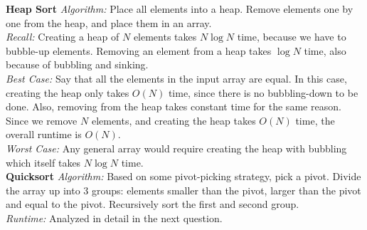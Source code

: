 \begin{solution}
\textbf{Heap Sort}
\textit{Algorithm:} Place all elements into a heap. Remove elements one by one from the heap, and place them in an array.\\
\textit{Recall:} Creating a heap of $N$ elements takes $N \log N$ time, because we have to bubble-up elements. Removing an element from a heap takes $\log N$ time, also because of bubbling and sinking. \\
\textit{Best Case:} Say that all the elements in the input array are equal. In this case, creating the heap only takes $O(N)$ time, since there is no bubbling-down to be done. Also, removing from the heap takes constant time for the same reason. Since we remove $N$ elements, and creating the heap takes $O(N)$ time, the overall runtime is $O(N)$.\\
\textit{Worst Case:} Any general array would require creating the heap with bubbling which itself takes $N \log N$ time.\\ 

\textbf{Quicksort}
\textit{Algorithm:} Based on some pivot-picking strategy, pick a pivot. Divide the array up into 3 groups: elements smaller than the pivot, larger than the pivot and equal to the pivot. Recursively sort the first and second group. \\
\textit{Runtime:} Analyzed in detail in the next question. \\
\end{solution}